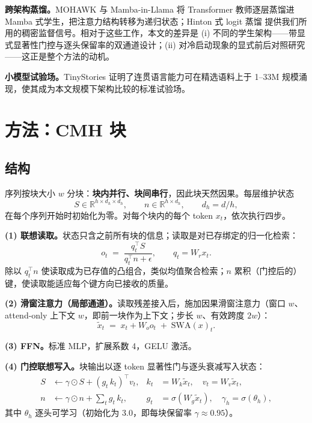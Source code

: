 \documentclass[11pt]{ctexart}
\newcommand{\cmh}{CMH}
\newcommand{\swa}{\mathrm{SWA}}
\begin{document}
\textbf{跨架构蒸馏。}MOHAWK \cite{wang2024mohawk} 与 Mamba-in-Llama \cite{wang2024mambaillama} 将 Transformer 教师逐层蒸馏进 Mamba 式学生，把注意力结构转移为递归状态；Hinton 式 logit 蒸馏 \cite{hinton2015distill} 提供我们所用的稠密监督信号。相对于这些工作，本文的差异是 (i) 不同的学生架构——带显式显著性门控与逐头保留率的双通道设计；(ii) 对冷启动现象的显式前后对照研究——这正是整个方法的动机。

\textbf{小模型试验场。}TinyStories \cite{eldan2023tinystories} 证明了连贯语言能力可在精选语料上于 1--33M 规模涌现，使其成为本文规模下架构比较的标准试验场。

\section{方法：\cmh{} 块}\label{sec:method}

\subsection{结构}

序列按块大小 $w$ 分块：\textbf{块内并行、块间串行}，因此块天然因果。每层维护状态
\[
S \in \mathbb{R}^{h \times d_h \times d_h}, \qquad n \in \mathbb{R}^{h \times d_h},
\qquad d_h = d/h,
\]
在每个序列开始时初始化为零。对每个块内的每个 token $x_t$，依次执行四步。

\textbf{(1) 联想读取。}状态只含之前所有块的信息；读取是对已存绑定的归一化检索：
\begin{equation}
o_t \;=\; \frac{q_t^{\top} S}{q_t^{\top} n + \epsilon}, \qquad q_t = W_r x_t .
\label{eq:read}
\end{equation}
除以 $q_t^\top n$ 使读取成为已存值的凸组合，类似均值聚合检索；$n$ 累积（门控后的）键，使读取能适应每个键方向已接收的质量。

\textbf{(2) 滑窗注意力（局部通道）。}读取残差接入后，施加因果滑窗注意力（窗口 $w$、attend-only 上下文 $w$，即前一块作为上下文；步长 $w$、有效跨度 $2w$）：
\begin{equation}
\tilde{x}_t \;=\; x_t + W_o o_t \;+\; \swa(x)_t .
\end{equation}

\textbf{(3) FFN。}标准 MLP，扩展系数 4，GELU 激活。

\textbf{(4) 门控联想写入。}块输出以逐 token 显著性门与逐头衰减写入状态：
\begin{align}
S &\leftarrow \gamma \odot S + (g_t\, k_t)^{\top} v_t,
& k_t &= W_k \tilde{x}_t, \quad v_t = W_v \tilde{x}_t, \\
n &\leftarrow \gamma \odot n + \textstyle\sum_t g_t\, k_t, &
g_t &= \sigma(W_g \tilde{x}_t), \quad \gamma_h = \sigma(\theta_h),
\end{align}
其中 $\theta_h$ 逐头可学习（初始化为 3.0，即每块保留率 $\gamma\approx 0.95$）。
\end{document}

